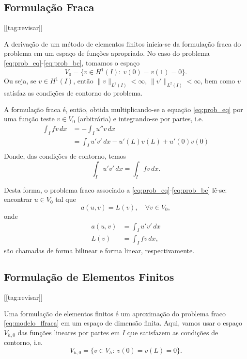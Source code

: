 \subsection{Formulação Fraca}
[[tag:revisar]]

A derivação de um método de elementos finitos inicia-se da formulação fraca do problema em um espaço de funções apropriado. No caso do problema \eqref{eq:prob_eq}-\eqref{eq:prob_bc}, tomamos o espaço
\begin{equation}
  V_0 = \{v\in H^1(I):~v(0)=v(1)=0\}.
\end{equation}
Ou seja, se $v\in H^1(I)$, então $\|v\|_{L^2(I)}<\infty$, $\|v'\|_{L^2(I)}<\infty$, bem como $v$ satisfaz as condições de contorno do problema.

A formulação fraca é, então, obtida multiplicando-se a equação \eqref{eq:prob_eq} por uma função teste $v\in V_0$ (arbitrária) e integrando-se por partes, i.e.
\begin{align}
  \int_I fv\,dx &= -\int_I u''v\,dx\\
  &= \int_I u'v'\,dx - u'(L)v(L) + u'(0)v(0)\\
\end{align}
Donde, das condições de contorno, temos
\begin{equation}
  \int_I u'v'\,dx = \int_I fv\,dx.
\end{equation}

Desta forma, o problema fraco associado a \eqref{eq:prob_eq}-\eqref{eq:prob_bc} lê-se: encontrar $u\in V_0$ tal que
\begin{equation}\label{eq:modelo_ffraca}
  a(u,v) = L(v),\quad\forall v\in V_0,
\end{equation}
onde
\begin{align}
  a(u,v) &= \int_I u'v'\,dx\label{eq:modelo_fbilinear}\\
  L(v) &= \int_I fv\,dx,\label{eq:modelo_flinear}
\end{align}
são chamadas de forma bilinear e forma linear, respectivamente.

\subsection{Formulação de Elementos Finitos}
[[tag:revisar]]

Uma formulação de elementos finitos é um aproximação do problema fraco \eqref{eq:modelo_ffraca} em um espaço de dimensão finita. Aqui, vamos usar o espaço $V_{h,0}$ das funções lineares por partes em $I$ que satisfazem as condições de contorno, i.e.
\begin{equation}
  V_{h,0} = \{v\in V_h:~v(0)=v(L)=0\}.
\end{equation}

